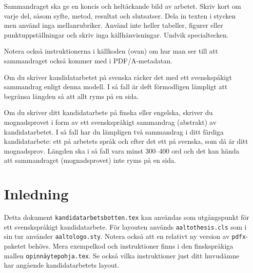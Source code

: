 \documentclass[swedish, 12pt, a4paper, elec, utf8, a-2b, online]{aaltothesis}
\date{4.9.2018}
\begin{document}
	
\makecoverpage

\makecopyrightpage


\begin{abstractpage}[swedish]
Sammandraget ska ge en koncis och heltäckande bild av arbetet. Skriv kort
om varje del, såsom syfte, metod, resultat och slutsatser. Dela in texten i
stycken men använd inga mellanrubriker. Använd inte heller tabeller,
figurer eller punktuppställningar och skriv inga källhänvisningar. Undvik
specialtecken. 

Notera också instruktionerna i källkoden (ovan) om hur man ser till att
sammandraget också kommer med i PDF/A-metadatan.

Om du skriver kandidatarbetet på svenska räcker det med ett svenskspåkigt
sammandrag enligt denna modell. I så fall är deft förmodligen lämpligt att
begränsa längden så att allt ryms på en sida.

Om du skriver ditt kandidatarbete på finska eller engelska, skriver du
mognadsprovet i form av ett svenskspråkigt sammandrag (abstrakt) av
kandidatarbetet. I så fall har du lämpligen två sammandrag i ditt färdiga
kandidatarbete: ett på arbetets språk och efter det ett på svenska, som då
är ditt mognadsprov. Längden ska i så fall vara minst 300--400 ord och det
kan hända att sammandraget (mognadsprovet) inte ryms på en sida.

\end{abstractpage}




\clearpage
\thesistableofcontents


\clearpage
\section{Inledning}

Detta dokument \texttt{kandidatarbetsbotten.tex} kan användas som
utgångspunkt för ett svenskspråkigt kandidatarbete. För layouten används
\texttt{aaltothesis.cls} som i sin tur använder
\texttt{aaltologo.sty}. Notera också att en relativt ny version av
\texttt{pdfx}-paketet behövs. Mera exempelkod och instruktioner finns i den
finskspråkiga mallen \texttt{opinnäytepohja.tex}. Se också vilka
instruktioner just ditt huvudämne har angående kandidatarbetets layout.
\end{document}
